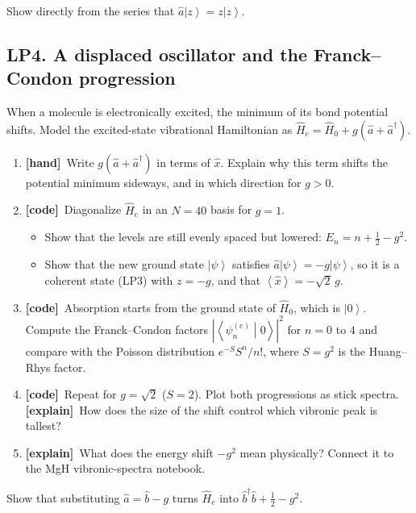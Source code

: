 \documentclass[11pt]{article}
\newif\ifsolutions
\newcommand{\tagbox}[2]{\textcolor{#1}{\textsf{\textbf{[#2]}}}}
\newcommand{\hand}{\tagbox{handc}{hand}}
\newcommand{\code}{\tagbox{codec}{code}}
\newcommand{\expl}{\tagbox{explc}{explain}}
\newcommand{\ans}[1]{\ifsolutions\par\noindent\hspace*{1.5em}\textcolor{ansc}{\small\textit{Answer:} #1}\fi}
\newcommand{\ket}[1]{\left|#1\right\rangle}
\newcommand{\braket}[2]{\left\langle#1\middle|#2\right\rangle}
\newcommand{\expval}[1]{\left\langle#1\right\rangle}
\newcommand{\ad}{\hat{a}^{\dagger}}
\newcommand{\aop}{\hat{a}}
\newcommand{\xop}{\hat{x}}
\newcommand{\Hop}{\hat{H}}
\begin{document}
\begin{gradext}
Show directly from the series that $\aop\ket z = z\ket z$.
\end{gradext}

\subsection*{LP4. A displaced oscillator and the Franck--Condon progression}

When a molecule is electronically excited, the minimum of its bond potential shifts.
Model the excited-state vibrational Hamiltonian as $\Hop_e = \Hop_0 + g(\aop + \ad)$.

\begin{enumerate}
\item \hand\ Write $g(\aop+\ad)$ in terms of $\xop$. Explain why this term shifts the potential minimum sideways, and in which direction for $g > 0$.
\ans{$g(\aop+\ad) = \sqrt2\,g\,\xop$. $\tfrac12x^2 + \sqrt2 g x$ is a parabola with its minimum moved to $x = -\sqrt2 g$.}

\item \code\ Diagonalize $\Hop_e$ in an $N = 40$ basis for $g = 1$.
\begin{itemize}
\item Show that the levels are still evenly spaced but lowered: $E_n = n + \tfrac12 - g^2$.
\item Show that the new ground state $\ket\psi$ satisfies $\aop\ket\psi = -g\ket\psi$, so it is a coherent state (LP3) with $z = -g$, and that $\expval{\xop} = -\sqrt2\,g$.
\end{itemize}
\ans{$E = -0.5,\ 0.5,\ 1.5,\dots$; $\expval{\xop} = -1.414$.}

\item \code\ Absorption starts from the ground state of $\Hop_0$, which is $\ket0$.
Compute the Franck--Condon factors $|\braket{\psi_n^{(e)}}{0}|^2$ for $n = 0$ to $4$ and compare with the Poisson distribution $e^{-S}S^n/n!$, where $S = g^2$ is the Huang--Rhys factor.
\ans{$g = 1$: $0.368,\ 0.368,\ 0.184,\ 0.061,\ 0.015$ (exact match).}

\item \code\ Repeat for $g = \sqrt2$ ($S = 2$). Plot both progressions as stick spectra.
\expl\ How does the size of the shift control which vibronic peak is tallest?
\ans{$0.135,\ 0.271,\ 0.271,\ 0.180,\ 0.090$. Larger displacement moves the intensity maximum to higher $n$ (near $n \approx S$); small displacement leaves the $0$--$0$ line strongest.}

\item \expl\ What does the energy shift $-g^2$ mean physically? Connect it to the MgH vibronic-spectra notebook.
\ans{It is the relaxation (reorganization) energy gained by letting the bond relax to its new equilibrium; it is why the $0$--$0$ line sits below the vertical transition energy.}
\end{enumerate}

\begin{gradext}
Show that substituting $\aop = \hat b - g$ turns $\Hop_e$ into $\hat b^\dagger\hat b + \tfrac12 - g^2$.
\end{gradext}
\end{document}
